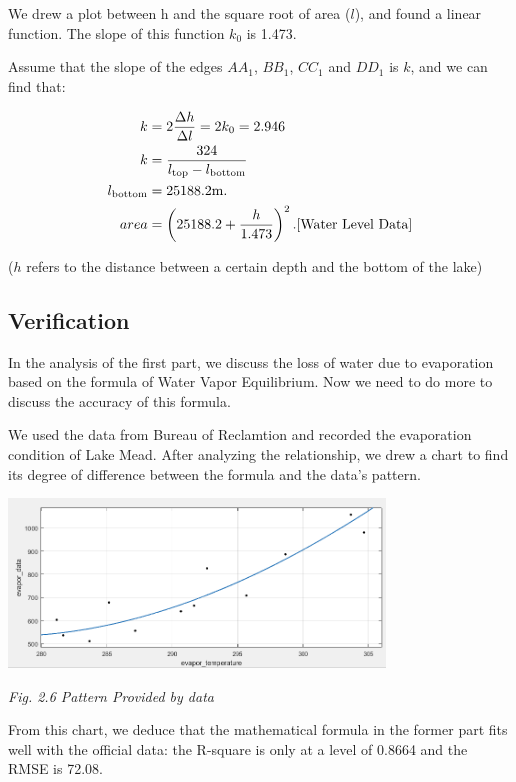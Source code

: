 \documentclass[12pt]{article}
\theoremstyle{definition}
\theoremstyle{remark}
\numberwithin{equation}{section}
\begin{document}
	We drew a plot between h and the square root of area ($l$), and found a linear function. The slope of this function $k_0$  is 1.473.
	
	Assume that the slope of the edges $AA_1$, $BB_1$, $CC_1$ and $DD_1$ is $k$, and we can find that:
	
	\begin{align*}
		k&=2\frac{\Delta h}{\Delta l}=2k_0=2.946\\
		k&=\frac{324}{l_\text{top}-l_\text{bottom}}\\
		l_{\text{bottom}}&=25188.2\rm{m}.\\
		area&=\left(25188.2+\frac{h}{1.473}\right)^2. \cite{Water Level Data}\\
	\end{align*}
	
	($h$ refers to the distance between a certain depth and the bottom of the lake)

	\subsection{Verification}

	In the analysis of the first part, we discuss the loss of water due to evaporation based on the formula of Water Vapor Equilibrium. Now we need to do more to discuss the accuracy of this formula.
	
	We used the data from Bureau of Reclamtion \cite{Storage Data} and recorded the evaporation condition of Lake Mead. After analyzing the relationship, we drew a chart to find its degree of difference between the formula and the data's pattern.
	
	\begin{center}
		\includegraphics[width=10cm]{2.6 Pattern provided by data.png}
		
		\small \textit{Fig. 2.6 Pattern Provided by data}
	\end{center}

	From this chart, we deduce that the mathematical formula in the former part fits well with the official data: the R-square is only at a level of 0.8664 and the RMSE is 72.08.
\end{document}
